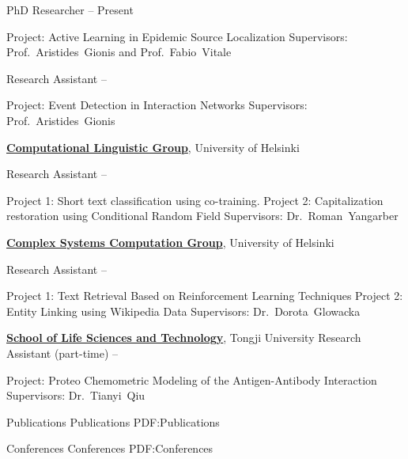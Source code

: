 \documentclass[letterpaper,MMMyyyy,nonstopmode]{simpleresumecv}
\begin{document}
\begin{Body}
\Gap
\BulletItem
PhD Researcher
\hfill
{} --
Present
\begin{Detail}
\SubBulletItem
Project:
Active Learning in Epidemic Source Localization
\SubBulletItem
Supervisors:
Prof.~Aristides~Gionis and
Prof.~Fabio~Vitale
\end{Detail}

\Gap
\BulletItem
Research Assistant
\hfill
{} --
\begin{Detail}
\SubBulletItem
Project:
Event Detection in Interaction Networks
\SubBulletItem
Supervisors:
Prof.~Aristides~Gionis
\end{Detail}


\Entry
\href{}
{\textbf{Computational Linguistic Group}},
University of Helsinki

\Gap
\BulletItem
Research Assistant
\hfill
{} --
\begin{Detail}
\SubBulletItem
Project 1: Short text classification using co-training.
\SubBulletItem
Project 2: Capitalization restoration using Conditional Random Field
\SubBulletItem
Supervisors:
Dr.~Roman~Yangarber
\end{Detail}

\Entry
\href{}
{\textbf{Complex Systems Computation Group}},
University of Helsinki

\Gap
\BulletItem
Research Assistant
\hfill
{} --
\begin{Detail}
\SubBulletItem
Project 1: Text Retrieval Based on Reinforcement Learning Techniques
\SubBulletItem
Project 2: Entity Linking using Wikipedia Data
\SubBulletItem
Supervisors:
Dr.~Dorota~Glowacka
\end{Detail}

\Entry
\href{}
{\textbf{School of Life Sciences and Technology}},
Tongji University
\Gap
\BulletItem
Research Assistant (part-time)
\hfill
{} --
\begin{Detail}
\SubBulletItem
Project: Proteo Chemometric Modeling of the Antigen-Antibody Interaction
\SubBulletItem
Supervisors:
Dr.~Tianyi~Qiu
\end{Detail}


\Section
{Publications}
{Publications}
{PDF:Publications}

\BigGap
\SubSection
{Conferences}
{Conferences}
{PDF:Conferences}


\end{Body}
\end{document}
